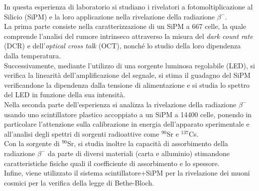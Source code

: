 In questa esperienza di laboratorio si studiano i rivelatori a fotomoltiplicazione al Silicio (SiPM) e la loro applicazione nella rivelazione della radiazione $\beta^-$. \\ La prima parte consiste nella caratterizzazione di un SiPM a 667 celle, la quale comprende l'analisi del rumore intrinseco attraverso la misura del \textit{dark count rate} (DCR) e dell'\textit{optical cross talk} (OCT), nonché lo studio della loro dipendenza dalla temperatura. \\ Successivamente, mediante l’utilizzo di una sorgente luminosa regolabile (LED), si verifica la linearità dell'amplificazione del segnale, si stima il guadagno del SiPM verificandone la dipendenza dalla tensione di alimentazione e si studia lo spettro del LED in funzione della sua intensità.\\ Nella seconda parte dell’esperienza si analizza la rivelazione della radiazione $\beta^-$ usando uno scintillatore plastico accoppiato a un SiPM a 14400 celle, ponendo in particolare l'attenzione sulla calibrazione in energia dell'apparato sperimentale e all'analisi degli spettri di sorgenti radioattive come $^{90}$Sr e $^{137}$Cs. \\ Con la sorgente di $^{90}$Sr, si studia inoltre la capacità di assorbimento della radiazione $\beta^-$ da parte di diversi materiali (carta e alluminio) stimandone caratteristiche fisiche quali il coefficiente di assorbimento e lo spessore. \\ Infine, viene utilizzato il sistema scintillatore+SiPM per la rivelazione dei muoni cosmici per la verifica della legge di Bethe-Bloch.
